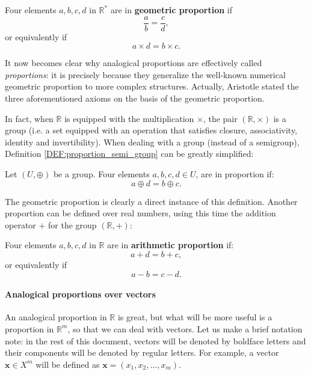 \begin{definition}
  Four elements $a, b, c, d$ in $\mathbb{R}^*$ are in \textbf{geometric
  proportion} if
  $$\frac{a}{b} = \frac{c}{d},$$
  or equivalently if
  $$a\times d = b\times c.$$
\end{definition}

It now becomes clear why analogical proportions are effectively called
\textit{proportions}: it is precisely because they generalize the well-known
numerical geometric proportion to more complex structures.  Actually, Aristotle
stated the three aforementioned axioms on the basis of the geometric
proportion.

In fact, when $\mathbb{R}$ is equipped with the multiplication $\times$, the
pair $(\mathbb{R}, \times)$ is a group (i.e. a set equipped with an operation
that satisfies  closure, associativity, identity and invertibility). When
dealing with a group (instead of a semigroup), Definition
\ref{DEF:proportion_semi_group} can be greatly simplified:

\begin{proposition}
  \label{PROP:proportion_group}
Let $(U, \oplus)$ be a group.  Four elements $a, b, c, d \in U$, are in
  proportion if:
  $$a \oplus d = b \oplus c.$$
\end{proposition}

The geometric proportion is clearly a direct instance of this definition.
Another proportion can be defined over real numbers, using this time the
addition operator $+$ for the group $(\mathbb{R}, +)$:

\begin{definition}
  Four elements $a, b, c, d$ in $\mathbb{R}$ are in \textbf{arithmetic
  proportion} if:
  $$a + d = b + c,$$
  or equivalently if
  $$a - b = c - d.$$
\end{definition}

\paragraph{Analogical proportions over vectors\\}

An analogical proportion in $\mathbb{R}$ is great, but what will be more useful
is a proportion in $\mathbb{R}^m$, so that we can deal with vectors.  Let us
make a brief notation note: in the rest of this document, vectors will be
denoted by boldface letters and their components will be denoted by regular
letters. For example, a vector $\mathbf{x} \in X^m$ will be defined as
$\mathbf{x} = (x_1, x_2, \dots, x_m)$.

